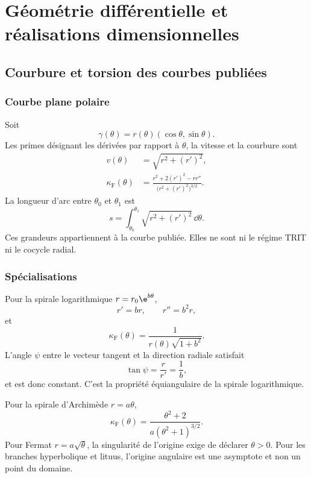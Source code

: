 \part{Géométrie différentielle et réalisations dimensionnelles}

\chapter{Courbure et torsion des courbes publiées}

\section{Courbe plane polaire}

Soit
\[
 \gamma(\theta)=r(\theta)(\cos\theta,\sin\theta).
\]
Les primes désignant les dérivées par rapport à \(\theta\), la vitesse et la courbure sont
\begin{align}
 v(\theta)&=\sqrt{r^2+(r')^2},\\
 \kappa_{\mathrm{F}}(\theta)&=
 \frac{r^2+2(r')^2-rr''}
 {\bigl(r^2+(r')^2\bigr)^{3/2}}.
 \label{espiral:eq:curvatura-polar}
\end{align}
La longueur d'arc entre \(\theta_0\) et \(\theta_1\) est
\[
 s=\int_{\theta_0}^{\theta_1}
 \sqrt{r^2+(r')^2}\,\dd\theta.
\]
Ces grandeurs appartiennent à la courbe publiée. Elles ne sont ni le régime TRIT ni le cocycle radial.

\section{Spécialisations}

Pour la spirale logarithmique \(r=r_0\e^{b\theta}\),
\[
 r'=br,\qquad r''=b^2r,
\]
et
\begin{equation}
 \kappa_{\mathrm{F}}(\theta)
 =\frac{1}{r(\theta)\sqrt{1+b^2}}.
 \label{espiral:eq:curvatura-log}
\end{equation}
L'angle \(\psi\) entre le vecteur tangent et la direction radiale satisfait
\[
 \tan\psi=\frac{r}{r'}=\frac1b,
\]
et est donc constant. C'est la propriété équiangulaire de la spirale logarithmique.


Pour la spirale d'Archimède \(r=a\theta\),
\[
 \kappa_{\mathrm{F}}(\theta)
 =\frac{\theta^2+2}{a(\theta^2+1)^{3/2}}.
\]
Pour Fermat \(r=a\sqrt\theta\), la singularité de l'origine exige de déclarer \(\theta>0\). Pour les branches hyperbolique et lituus, l'origine angulaire est une asymptote et non un point du domaine.
